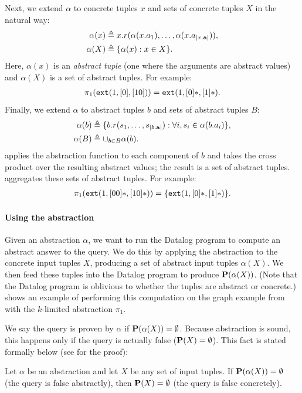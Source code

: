 Next, we extend $\alpha$ to concrete tuples $x$ and sets of concrete tuples $X$
in the natural way:
\begin{align}
\alpha(x) &\triangleq x.r(\alpha(x.a_1), \dots, \alpha(x.a_{|x.\mathbf{a}|})), \\
\alpha(X) &\triangleq \{ \alpha(x) : x \in X \}.
\end{align}
Here, $\alpha(x)$ is an {\em abstract tuple} (one where the arguments are abstract values)
and $\alpha(X)$ is a set of abstract tuples.
For example:
\begin{align}
\pi_1(\text{\tt ext}(1, [0], [10])) = \text{\tt ext}(1, [0]*, [1]*). \nonumber
\end{align}
Finally, we extend $\alpha$ to abstract tuples $b$ and sets of abstract tuples $B$:
\begin{align}
\alpha(b) &\triangleq \{ b.r(s_1, \dots, s_{|b.\mathbf{a}|}) : \forall i, s_i \in \alpha(b.a_i) \}, \label{eqn:alphab} \\
\alpha(B) &\triangleq \cup_{b \in B} \alpha(b). \label{eqn:alphaB}
\end{align}
 applies the abstraction function to each component of $b$ and takes the cross product over the resulting abstract values;
the result is a set of abstract tuples.
 aggregates these sets of abstract tuples.
For example:
\begin{align}
\pi_1(\text{\tt ext}(1, [00]*, [10]*)) = \{ \text{\tt ext}(1, [0]*, [1]*) \}. \nonumber
\end{align}

\paragraph{Using the abstraction}

Given an abstraction $\alpha$,
we want to run the Datalog program to compute an abstract answer to the query.
We do this by applying the abstraction to the concrete input tuples $X$,
producing a set of abstract input tuples $\alpha(X)$.
We then feed these tuples into the Datalog program to produce $\mathbf{P}(\alpha(X))$.
(Note that the Datalog program is oblivious to whether the tuples are abstract or concrete.)
 shows an example of performing this computation on the
graph example from  with the $k$-limited abstraction $\pi_1$.

We say the query is proven by $\alpha$ if $\mathbf{P}(\alpha(X)) = \emptyset$.
Because abstraction is sound,
this happens only if the query is actually false ($\mathbf{P}(X) = \emptyset$).
This fact is stated formally below (see  for the proof):
\begin{proposition}
\label{prop:soundness}
Let $\alpha$ be an abstraction and let $X$ be any set of input tuples.
If $\mathbf{P}(\alpha(X)) = \emptyset$ (the query is false abstractly),
then $\mathbf{P}(X) = \emptyset$ (the query is false concretely).
\end{proposition}

